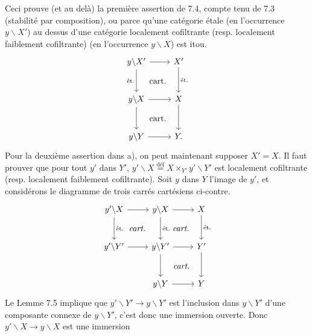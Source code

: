 \documentclass[11pt]{article}
\newcommand{\msp}[1]{\marginpar{\footnotesize [#1]}}
\begin{document}
Ceci prouve (et au delà) la première assertion de 7.4, compte tenu de 7.3 (stabilité par composition), ou parce qu'une \msp{page 94} catégorie étale (en l'occurrence $y\backslash X'$) au dessus d'une catégorie localement cofiltrante (resp. localement faiblement cofiltrante) (en l'occurrence $y\backslash X$) est itou.
\[
\begin{tikzcd}[row sep=large]
y\backslash X' \arrow[r] \arrow[d, "\text{ét.}"'] \arrow[dr, phantom, "\text{cart.}"] & X' \arrow[d, "\text{ét.}"] \\
y\backslash X \arrow[r] \arrow[d] \arrow[dr, phantom, "\text{cart.}"] & X \arrow[d] \\
y\backslash Y \arrow[r] & Y.
\end{tikzcd}
\]
Pour la deuxième assertion dans a), on peut maintenant supposer $X' = X$. Il faut prouver que pour tout $y'$ dans $Y'$, $y'\backslash X \overset{\text{déf}}{=} X \times_{Y'} y'\backslash Y'$ est localement cofiltrante (resp. localement faiblement cofiltrante). Soit $y$ dans $Y$ l'image de $y'$, et considérons le diagramme de trois carrés cartésiens ci-contre.
\[
\begin{tikzcd}[row sep=large]
y'\backslash X \arrow[r] \arrow[d, "\text{ét.}"] \arrow[dr, phantom, "\textit{cart.}"] & y\backslash X \arrow[r] \arrow[d, "\text{ét.}"] \arrow[dr, phantom, "\textit{cart.}"] & X \arrow[d, "\text{ét.}"] \\
y'\backslash Y' \arrow[r] & y\backslash Y' \arrow[r] \arrow[d] \arrow[dr, phantom, "\textit{cart.}"] & Y' \arrow[d] \\
 & y\backslash Y \arrow[r] & Y
\end{tikzcd}
\]
Le Lemme 7.5 implique que $y'\backslash Y' \longrightarrow y\backslash Y'$ est l'inclusion dans $y\backslash Y'$ d'une composante connexe de $y\backslash Y'$, c'est donc une immersion ouverte. Donc $y'\backslash X \longrightarrow y\backslash X$ est une immersion
\end{document}
